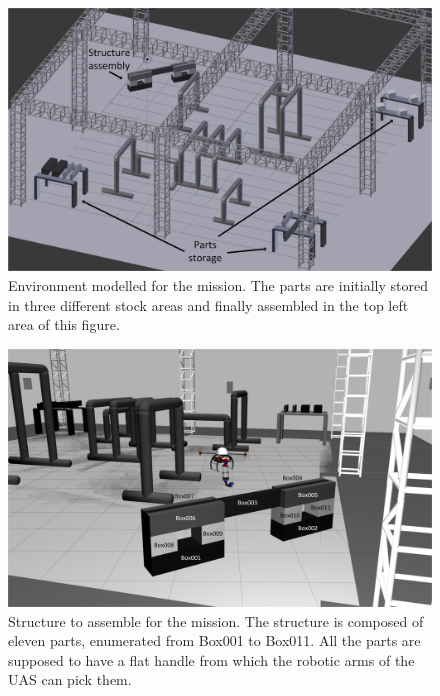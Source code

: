 \documentclass[letterpaper, 12pt, conference]{ieeeconf}    %
\begin{document}

\begin{figure}
    \centering
    \includegraphics[width=1.0\columnwidth]{environment_visio.png}
    \caption[Environment modelled for the mission.]{Environment modelled for the mission. The parts are initially stored in three different stock areas and finally assembled in the top left area of this figure.}
    \label{fig:environment}
\end{figure}

\begin{figure}
    \centering
    \includegraphics[width=1.0\columnwidth]{structure_visio.png}
    \caption[Structure to assemble for the mission.]{Structure to assemble for the mission. The structure is composed of eleven parts, enumerated from Box001 to Box011. All the parts are supposed to have a flat handle from which the robotic arms of the UAS can pick them.}
    \label{fig:structure}
\end{figure}
\end{document}

